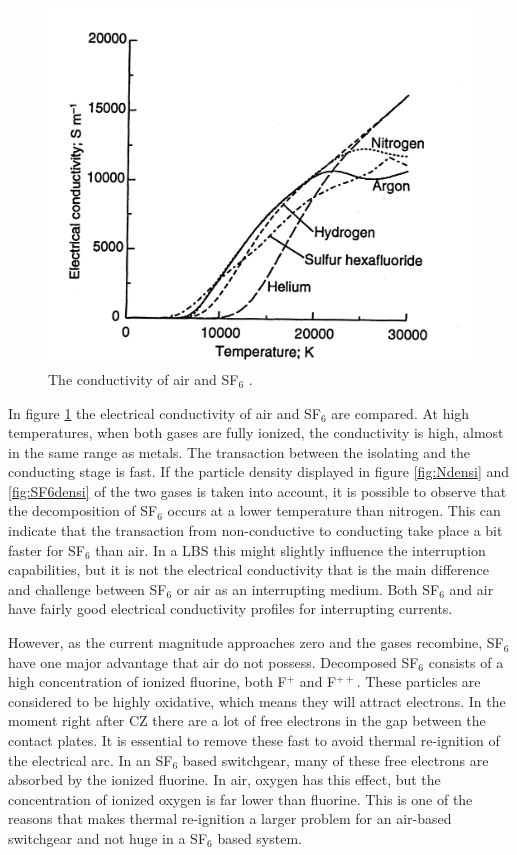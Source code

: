 \documentclass[10pt,a4paper]{article}
\begin{document}
\begin{figure}[H]
\centering
\includegraphics[scale=1]{Bilder/Discussion/conductSF6AndAIR.png}
\caption{The conductivity of air and SF${_6}$ \cite{bib:THFD}.} \label{fig:AirandSF6ConComp}
\end{figure}

In figure \ref{fig:AirandSF6ConComp} the electrical conductivity of air and SF$_6$ are compared. At high temperatures, when both gases are fully ionized, the conductivity is high, almost in the same range as metals. The transaction between the isolating and the conducting stage is fast. If the particle density displayed in figure \ref{fig:Ndensi} and \ref{fig:SF6densi} of the two gases is taken into account, it is possible to observe that the decomposition of SF$_6$ occurs at a lower temperature than nitrogen. This can indicate that the transaction from non-conductive to conducting take place a bit faster for SF$_6$ than air. In a LBS this might slightly influence the interruption capabilities, but it is not the electrical conductivity that is the main difference and challenge between SF$_6$ or air as an interrupting medium. Both SF$_6$ and air have fairly good electrical conductivity profiles for interrupting currents.

However, as the current magnitude approaches zero and the gases recombine, SF$_6$ have one major advantage that air do not possess. Decomposed SF$_6$ consists of a high concentration of ionized fluorine, both F$^{+}$ and F$^{++}$. These particles are considered to be highly oxidative, which means they will attract electrons. In the moment right after CZ there are a lot of free electrons in the gap between the contact plates. It is essential to remove these fast to avoid thermal re-ignition of the electrical arc. In an SF$_6$ based switchgear, many of these free electrons are absorbed by the ionized fluorine. In air, oxygen has this effect, but the concentration of ionized oxygen is far lower than fluorine. This is one of the reasons that makes thermal re-ignition a larger problem for an air-based switchgear and not huge in a SF$_6$ based system.
\end{document}
